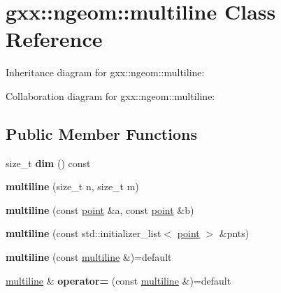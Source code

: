 \hypertarget{classgxx_1_1ngeom_1_1multiline}{}\section{gxx\+:\+:ngeom\+:\+:multiline Class Reference}
\label{classgxx_1_1ngeom_1_1multiline}


Inheritance diagram for gxx\+:\+:ngeom\+:\+:multiline\+:


Collaboration diagram for gxx\+:\+:ngeom\+:\+:multiline\+:
\subsection*{Public Member Functions}
\begin{DoxyCompactItemize}
\item 
size\+\_\+t {\bfseries dim} () const \hypertarget{classgxx_1_1ngeom_1_1multiline_adb243bed1e40f6706c0a278d33683250}{}\label{classgxx_1_1ngeom_1_1multiline_adb243bed1e40f6706c0a278d33683250}

\item 
{\bfseries multiline} (size\+\_\+t n, size\+\_\+t m)\hypertarget{classgxx_1_1ngeom_1_1multiline_a2c3e192065e1c6e662e3b28cd3ae0885}{}\label{classgxx_1_1ngeom_1_1multiline_a2c3e192065e1c6e662e3b28cd3ae0885}

\item 
{\bfseries multiline} (const \hyperlink{classgxx_1_1ngeom_1_1point}{point} \&a, const \hyperlink{classgxx_1_1ngeom_1_1point}{point} \&b)\hypertarget{classgxx_1_1ngeom_1_1multiline_a45ca07dffef906ad5ecbf79e19418074}{}\label{classgxx_1_1ngeom_1_1multiline_a45ca07dffef906ad5ecbf79e19418074}

\item 
{\bfseries multiline} (const std\+::initializer\+\_\+list$<$ \hyperlink{classgxx_1_1ngeom_1_1point}{point} $>$ \&pnts)\hypertarget{classgxx_1_1ngeom_1_1multiline_add8c0f1e5ccaf0795a8ac45d90c77068}{}\label{classgxx_1_1ngeom_1_1multiline_add8c0f1e5ccaf0795a8ac45d90c77068}

\item 
{\bfseries multiline} (const \hyperlink{classgxx_1_1ngeom_1_1multiline}{multiline} \&)=default\hypertarget{classgxx_1_1ngeom_1_1multiline_a3327b1d79ca0b37c242cb93aa6165845}{}\label{classgxx_1_1ngeom_1_1multiline_a3327b1d79ca0b37c242cb93aa6165845}

\item 
\hyperlink{classgxx_1_1ngeom_1_1multiline}{multiline} \& {\bfseries operator=} (const \hyperlink{classgxx_1_1ngeom_1_1multiline}{multiline} \&)=default\hypertarget{classgxx_1_1ngeom_1_1multiline_a1f7d76881f2f47976b79dbbf3ac32ba8}{}\label{classgxx_1_1ngeom_1_1multiline_a1f7d76881f2f47976b79dbbf3ac32ba8}


\end{DoxyCompactItemize}
